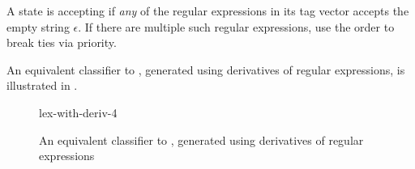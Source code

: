 A state is accepting if \textit{any} of the regular expressions in its tag vector accepts the empty string $\epsilon$. If there are multiple such regular expressions, use the order to break ties via priority.

An equivalent classifier to , generated using derivatives of regular expressions, is illustrated in .

\begin{figure}[H]
    \centering
    {lex-with-deriv-4}
    \caption{An equivalent classifier to , generated using derivatives of regular expressions}
    \label{fig:lex-with-deriv}
\end{figure}
